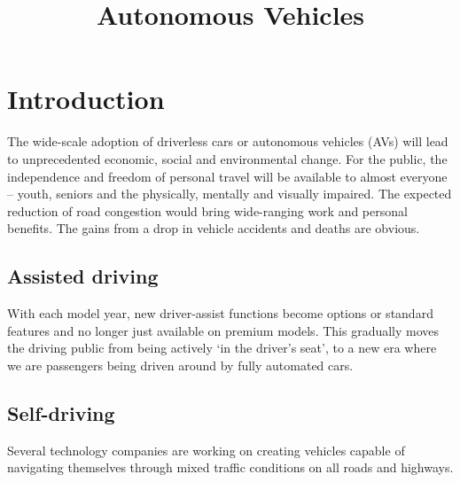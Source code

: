 \documentclass[a4paper,12pt]{report}
\begin{document}
	\title{Autonomous Vehicles}
	\maketitle
	\newpage
	\tableofcontents
	\newpage
	\section{Introduction}The wide-scale adoption of driverless cars or autonomous vehicles (AVs) will lead to unprecedented economic, social and environmental change. For the public, the independence and freedom of personal travel will be available to almost everyone – youth, seniors and the physically, mentally and visually impaired. The expected reduction of road congestion would bring wide-ranging work and personal benefits. The gains from a drop in vehicle accidents and deaths are obvious.
	
	
	\subsection{Assisted driving}
	With each model year, new driver-assist functions become options or standard features and no longer just available on premium models. This gradually moves the driving public from being actively ‘in the driver’s seat’, to a new era where we are passengers being driven around by fully automated cars.
	
	
	
	\subsection{Self-driving}
	Several technology companies are working on creating vehicles capable of navigating themselves through mixed traffic conditions on all roads and highways.
	
\end{document}
